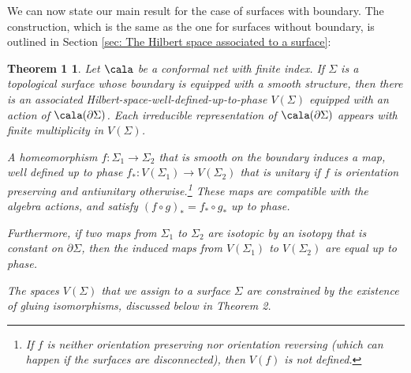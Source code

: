 \documentclass[a4paper,10pt,leqno]{amsart}
\theoremstyle{plain}
\newtheorem*{theorem2*}{Theorem 1}
\theoremstyle{definition}
\theoremstyle{remark}
\begin{document}
We can now state our main result for the case of surfaces with boundary.
The construction, which is the same as the one for surfaces without boundary, is outlined in Section \ref{sec: The Hilbert space associated to a surface}:

\begin{theorem2*}Let $\cala$ be a conformal net with finite index.
If $\Sigma$ is a topological surface whose boundary is equipped with a smooth structure,
then there is an associated Hilbert-space-well-defined-up-to-phase $V(\Sigma)$ equipped with an action of $\cala(\partial \Sigma)$.
Each irreducible representation of $\cala(\partial \Sigma)$ appears with finite multiplicity in $V(\Sigma)$.

A homeomorphism $f:\Sigma_1\to \Sigma_2$ that is smooth on the boundary induces a map, well defined up to phase $f_*:V(\Sigma_1)\to V(\Sigma_2)$
that is unitary if $f$ is orientation preserving and antiunitary otherwise.\footnote{If $f$ is neither orientation preserving nor orientation reversing (which can happen if the surfaces are disconnected), then $V(f)$ is not defined.}
These maps are compatible with the algebra actions, and satisfy $(f\circ g)_*=f_*\circ g_*$ up to phase.


Furthermore, if two maps from $\Sigma_1$ to $\Sigma_2$ are isotopic by an isotopy that is constant on $\partial \Sigma$,
then the induced maps from $V(\Sigma_1)$ to $V(\Sigma_2)$ are equal up to phase.

The spaces $V(\Sigma)$ that we assign to a surface $\Sigma$ are constrained by the existence of gluing isomorphisms, discussed below in Theorem 2.

\end{theorem2*}
\end{document}
